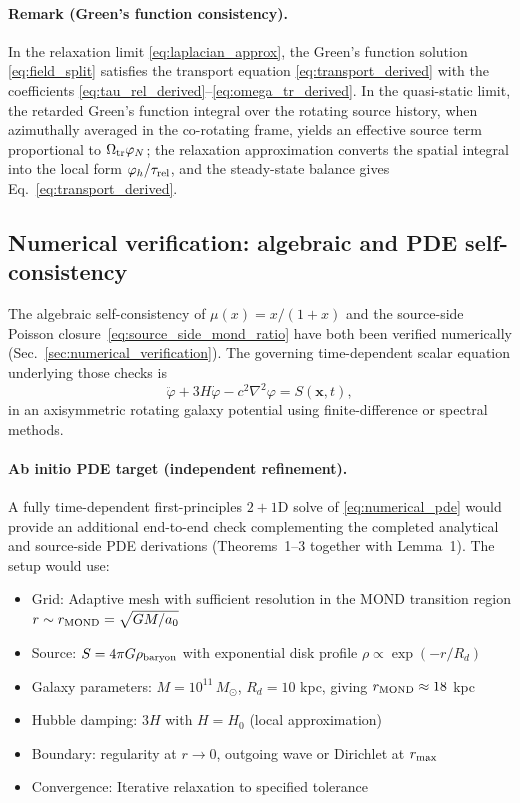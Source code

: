 \documentclass[11pt]{article}
\begin{document}
\paragraph{Remark (Green's function consistency).}
In the relaxation limit \eqref{eq:laplacian_approx}, the Green's function solution \eqref{eq:field_split} satisfies the transport equation \eqref{eq:transport_derived} with the coefficients \eqref{eq:tau_rel_derived}--\eqref{eq:omega_tr_derived}.
In the quasi-static limit, the retarded Green's function integral over the rotating source history, when azimuthally averaged in the co-rotating frame, yields an effective source term proportional to $\Omega_{\rm tr}\varphi_N$; the relaxation approximation converts the spatial integral into the local form $\varphi_h/\tau_{\rm rel}$, and the steady-state balance gives Eq.~\eqref{eq:transport_derived}.

\subsection{Numerical verification: algebraic and PDE self-consistency}

The algebraic self-consistency of $\mu(x)=x/(1+x)$ and the source-side Poisson
closure~\eqref{eq:source_side_mond_ratio} have both been verified numerically
(Sec.~\ref{sec:numerical_verification}).  The governing time-dependent scalar
equation underlying those checks is
\begin{equation}
\ddot{\varphi} + 3H\dot{\varphi} - c^2\nabla^2\varphi = S(\mathbf{x},t),
\label{eq:numerical_pde}
\end{equation}
in an axisymmetric rotating galaxy potential using finite-difference or spectral methods.

\paragraph{Ab initio PDE target (independent refinement).}
A fully time-dependent first-principles $2+1$D solve of
\eqref{eq:numerical_pde} would provide an additional end-to-end check
complementing the completed analytical and source-side PDE derivations
(Theorems~1--3 together with Lemma~1).  The setup would use:
\begin{itemize}
\item Grid: Adaptive mesh with sufficient resolution in the MOND transition region $r \sim r_{\rm MOND} = \sqrt{GM/a_0}$
\item Source: $S = 4\pi G \rho_{\rm baryon}$ with exponential disk profile $\rho \propto \exp(-r/R_d)$
\item Galaxy parameters: $M = 10^{11}\,M_\odot$, $R_d = 10$ kpc, giving $r_{\rm MOND} \approx 18$ kpc
\item Hubble damping: $3H$ with $H = H_0$ (local approximation)
\item Boundary: regularity at $r \to 0$, outgoing wave or Dirichlet at $r_{\rm max}$
\item Convergence: Iterative relaxation to specified tolerance
\end{itemize}
\end{document}
